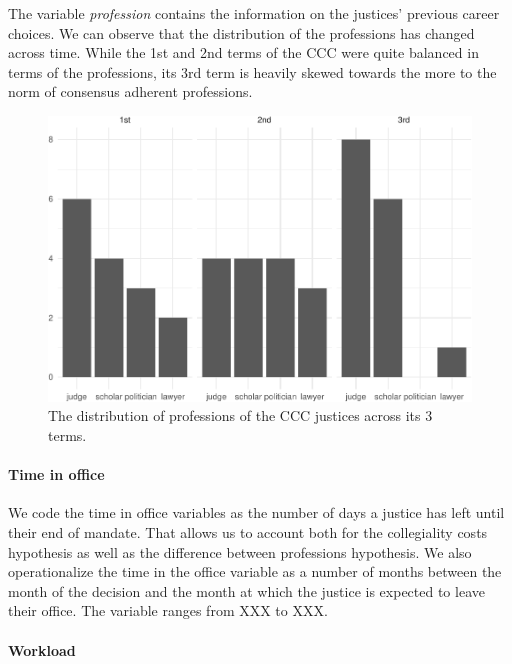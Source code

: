 \documentclass[
  11pt,
]{article}
\begin{document}
The variable \emph{profession} contains the information on the justices'
previous career choices. We can observe that the distribution of the
professions has changed across time. While the 1st and 2nd terms of the
CCC were quite balanced in terms of the professions, its 3rd term is
heavily skewed towards the more to the norm of consensus adherent
professions.

\begin{figure}
\centering
\includegraphics{separate_opinions_files/figure-latex/unnamed-chunk-4-1.pdf}
\caption{The distribution of professions of the CCC justices across its
3 terms.}
\end{figure}

\hypertarget{time-in-office}{%
\paragraph{Time in office}\label{time-in-office}}

We code the time in office variables as the number of days a justice has
left until their end of mandate. That allows us to account both for the
collegiality costs hypothesis as well as the difference between
professions hypothesis. We also operationalize the time in the office
variable as a number of months between the month of the decision and the
month at which the justice is expected to leave their office. The
variable ranges from XXX to XXX.

\hypertarget{workload}{%
\paragraph{Workload}\label{workload}}
\end{document}
